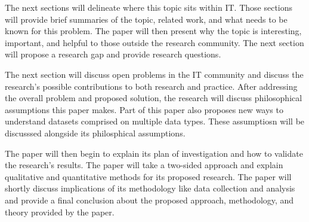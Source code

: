 The next sections will delineate where this topic sits within IT.  Those sections will provide brief summaries of the topic, related work, and what needs to be known for this problem.  The paper will then present why the topic is interesting, important, and helpful to those outside the research community.  The next section will propose a research gap and provide research questions.

The next section will discuss open problems in the IT community and discuss the research's possible contributions to both research and practice.  After addressing the overall problem and proposed solution, the research will discuss philosophical assumptions this paper makes.  Part of this paper also proposes new ways to understand datasets comprised on multiple data types.  These assumptiosn will be discusssed alongside its philosphical assumptions.

The paper will then begin to explain its plan of investigation and how to validate the research's results.  The paper will take a two-sided approach and explain qualitative and quantitative methods for its proposed research.  The paper will shortly discuss implications of its methodology like data collection and analysis and provide a final conclusion about the proposed approach, methodology, and theory provided by the paper.
